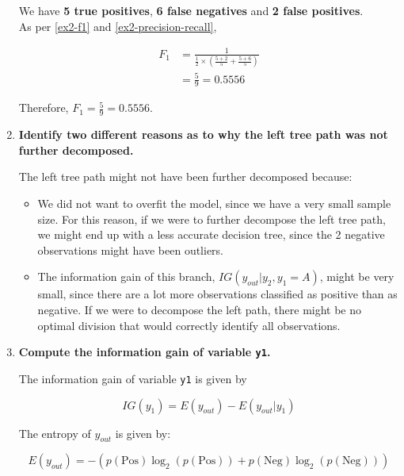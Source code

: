 \documentclass[12pt]{article}
\begin{document}
\begin{enumerate}[leftmargin=\labelsep]
          We have \textbf{5 true positives}, \textbf{6 false negatives} and \textbf{2 false positives}.\\
          As per \eqref{ex2-f1} and \eqref{ex2-precision-recall},

          \[
              \begin{aligned}
                  F_1 & = \frac{1}{\frac{1}{2} \times \left(\frac{5 + 2}{5} + \frac{5 + 6}{5}\right)} \\
                      & = \frac{5}{9} = 0.5556
              \end{aligned}
          \]

          Therefore, \(F_1 = \frac{5}{9} = 0.5556\).

    \item \textbf{Identify two different reasons as to why the left tree path was not further decomposed.}

          The left tree path might not have been further decomposed because:

          \begin{itemize}
              \item We did not want to overfit the model, since we have a very small sample size.
                    For this reason, if we were to further decompose the left tree path, we might end up with a less accurate
                    decision tree, since the 2 negative observations might have been outliers.
              \item The information gain of this branch, \(IG(y_{out} | y_2, y_1 = A)\), might be very small,
                    since there are a lot more observations classified as positive than as negative.
                    If we were to decompose the left path, there might be no optimal division that would correctly identify all observations.
          \end{itemize}

    \item \textbf{Compute the information gain of variable \texttt{y1}.}

          The information gain of variable \texttt{y1} is given by

          \begin{equation}\label{ex4-ig}
              IG(y_1) = E(y_{out}) - E(y_{out} | y_1)
          \end{equation}

          The entropy of \(y_{out}\) is given by:

          \[
              E(y_{out}) = - \left(p(\text{Pos}) \log_2 \left(p(\text{Pos})\right) + p(\text{Neg}) \log_2 \left(p(\text{Neg})\right)\right)
          \]


\end{enumerate}
\end{document}
